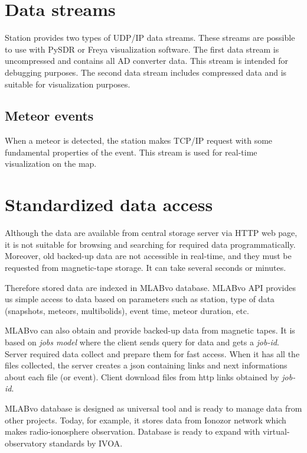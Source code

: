 \documentclass[10pt,a4paper,twoside,dvips]{article}
\begin{document}
\begin{IMCpaper}
\section{Data streams}
Station provides two types of UDP/IP data streams. These streams are possible to use with PySDR or Freya visualization software. The first data stream is uncompressed and contains all AD converter data. This stream is intended for debugging purposes. The second data stream includes compressed data and is suitable for visualization purposes.                                              

\subsection{Meteor events}
When a meteor is detected, the station makes TCP/IP request with some fundamental properties of the event. This stream is used for real-time visualization on the map.                                                                                        

\section{Standardized data access}
Although the data are available from central storage server via HTTP web page, it is not suitable for browsing and searching for required data programmatically. Moreover, old backed-up data are not accessible in real-time, and they must be requested from magnetic-tape storage. It can take several seconds or minutes.

Therefore stored data are indexed in MLABvo database. MLABvo API provides us simple access to data based on parameters such as station, type of data (snapshots, meteors, multibolids), event time, meteor duration, etc.                   

MLABvo can also obtain and provide backed-up data from magnetic tapes. It is based on \textit{jobs model} where the client sends query for data and gets a \textit{job-id}. Server required data collect and prepare them for fast access. When it has all the files collected, the server creates a json containing links and next informations about each file (or event). Client download files from http links obtained by \textit{job-id}.

MLABvo database is designed as universal tool and is ready to manage data from other projects. Today, for example, it stores data from Ionozor network which makes radio-ionosphere observation. Database is ready to expand with virtual-observatory standards by IVOA. 


\end{IMCpaper}
\end{document}
